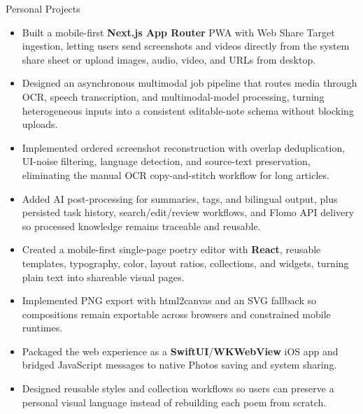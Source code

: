 \documentclass{resume} %
\begin{document}
\begin{workSection}{Personal Projects}
    \customItem[title=Type Machine (Media Transcriber), keyHighlight=AI-native multimodal capture and knowledge-processing PWA, duration=2026]
    \begin{itemize}
        \vspace{-0.5em}\itemsep -6pt {}
        \item Built a mobile-first \textbf{Next.js App Router} PWA with Web Share Target ingestion, letting users send screenshots and videos directly from the system share sheet or upload images, audio, video, and URLs from desktop.
        \item Designed an asynchronous multimodal job pipeline that routes media through OCR, speech transcription, and multimodal-model processing, turning heterogeneous inputs into a consistent editable-note schema without blocking uploads.
        \item Implemented ordered screenshot reconstruction with overlap deduplication, UI-noise filtering, language detection, and source-text preservation, eliminating the manual OCR copy-and-stitch workflow for long articles.
        \item Added AI post-processing for summaries, tags, and bilingual output, plus persisted task history, search/edit/review workflows, and Flomo API delivery so processed knowledge remains traceable and reusable.
    \end{itemize}

    \customItem[title=OnePoem, keyHighlight=Cross-platform poetry composition and export tool, duration=Apr. 2026]
    \begin{itemize}
        \vspace{-0.5em}\itemsep -6pt {}
        \item Created a mobile-first single-page poetry editor with \textbf{React}, reusable templates, typography, color, layout ratios, collections, and widgets, turning plain text into shareable visual pages.
        \item Implemented PNG export with html2canvas and an SVG fallback so compositions remain exportable across browsers and constrained mobile runtimes.
        \item Packaged the web experience as a \textbf{SwiftUI}/\textbf{WKWebView} iOS app and bridged JavaScript messages to native Photos saving and system sharing.
        \item Designed reusable styles and collection workflows so users can preserve a personal visual language instead of rebuilding each poem from scratch.
    \end{itemize}


\end{workSection}
\end{document}
